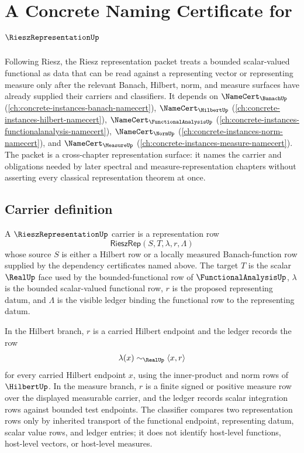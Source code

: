 \chapter{A Concrete Naming Certificate for $\RieszRepresentationUp$}
\label{ch:concrete-instances-rieszrepresentation-namecert}

Following Riesz, the Riesz representation packet treats a bounded scalar-valued functional as data that can be read against a representing vector or representing measure only after the relevant Banach, Hilbert, norm, and measure surfaces have already supplied their carriers and classifiers. It depends on $\NameCert_{\BanachUp}$ (\autoref{ch:concrete-instances-banach-namecert}), $\NameCert_{\HilbertUp}$ (\autoref{ch:concrete-instances-hilbert-namecert}), $\NameCert_{\FunctionalAnalysisUp}$ (\autoref{ch:concrete-instances-functionalanalysis-namecert}), $\NameCert_{\NormUp}$ (\autoref{ch:concrete-instances-norm-namecert}), and $\NameCert_{\MeasureUp}$ (\autoref{ch:concrete-instances-measure-namecert}). The packet is a cross-chapter representation surface: it names the carrier and obligations needed by later spectral and measure-representation chapters without asserting every classical representation theorem at once.

\section{Carrier definition}
\label{sec:rieszrepresentation-carrier}

\begin{definition}
\label{def:rieszrepresentation-carrier}
A $\RieszRepresentationUp$ carrier is a representation row
$$
\mathsf{RieszRep}(S,T,\lambda,r,\Lambda)
$$
whose source $S$ is either a Hilbert row or a locally measured Banach-function row supplied by the dependency certificates named above. The target $T$ is the scalar $\RealUp$ face used by the bounded-functional row of $\FunctionalAnalysisUp$, $\lambda$ is the bounded scalar-valued functional row, $r$ is the proposed representing datum, and $\Lambda$ is the visible ledger binding the functional row to the representing datum.

In the Hilbert branch, $r$ is a carried Hilbert endpoint and the ledger records the row
$$
\lambda(x) \sim_{\RealUp} \langle x,r\rangle
$$
for every carried Hilbert endpoint $x$, using the inner-product and norm rows of $\HilbertUp$. In the measure branch, $r$ is a finite signed or positive measure row over the displayed measurable carrier, and the ledger records scalar integration rows against bounded test endpoints. The classifier compares two representation rows only by inherited transport of the functional endpoint, representing datum, scalar value rows, and ledger entries; it does not identify host-level functions, host-level vectors, or host-level measures.
\end{definition}

